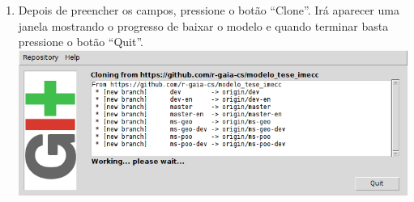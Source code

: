 \begin{enumerate}
  \item Depois de preencher os campos, pressione o botão ``Clone''. Irá aparecer
    uma janela mostrando o progresso de baixar o modelo e quando terminar
    basta pressione o botão ``Quit''.\\
    \includegraphics[scale=.6]{figuras/git-gui03}
\end{enumerate}

